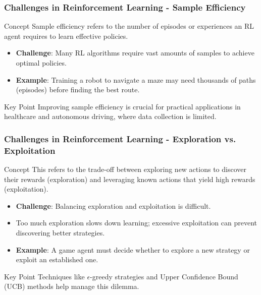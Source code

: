 \documentclass{beamer}
\begin{document}
\begin{frame}[fragile]
    \frametitle{Challenges in Reinforcement Learning - Sample Efficiency}
    \begin{block}{Concept}
        Sample efficiency refers to the number of episodes or experiences an RL agent requires to learn effective policies.
    \end{block}
    \begin{itemize}
        \item \textbf{Challenge}: Many RL algorithms require vast amounts of samples to achieve optimal policies.
        \item \textbf{Example}: Training a robot to navigate a maze may need thousands of paths (episodes) before finding the best route.
    \end{itemize}
    \begin{block}{Key Point}
        Improving sample efficiency is crucial for practical applications in healthcare and autonomous driving, where data collection is limited.
    \end{block}
\end{frame}

\begin{frame}[fragile]
    \frametitle{Challenges in Reinforcement Learning - Exploration vs. Exploitation}
    \begin{block}{Concept}
        This refers to the trade-off between exploring new actions to discover their rewards (exploration) and leveraging known actions that yield high rewards (exploitation).
    \end{block}
    \begin{itemize}
        \item \textbf{Challenge}: Balancing exploration and exploitation is difficult.
        \item Too much exploration slows down learning; excessive exploitation can prevent discovering better strategies.
        \item \textbf{Example}: A game agent must decide whether to explore a new strategy or exploit an established one.
    \end{itemize}
    \begin{block}{Key Point}
        Techniques like $\epsilon$-greedy strategies and Upper Confidence Bound (UCB) methods help manage this dilemma.
    \end{block}
\end{frame}
\end{document}

